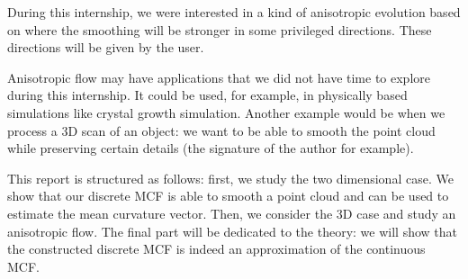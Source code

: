 During this internship, we were interested in a kind of anisotropic evolution
based on \cite{chambolle2012nonlocal} where the smoothing will be stronger in
some privileged directions. These directions will be given by the user.

Anisotropic flow may have applications that we did not have time to explore
during this internship. It could be used, for example, in physically based
simulations like crystal growth simulation. Another example would be when we
process a 3D scan of an object: we want to be able to smooth the point cloud
while preserving certain details (the signature of the author for example).

This report is structured as follows: first, we study the two dimensional case.
We show that our discrete MCF is able to smooth a point cloud and can be used to
estimate the mean curvature vector. Then, we consider the 3D case and study an
anisotropic flow. The final part will be dedicated to the theory: we will show
that the constructed discrete MCF is indeed an approximation of the continuous
MCF.


